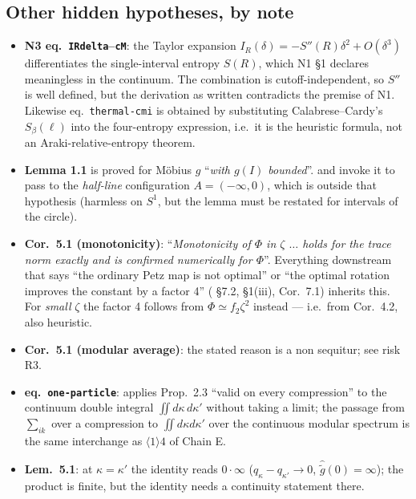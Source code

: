 \documentclass[11pt]{article}
\newcommand{\NI}{N1}\newcommand{\NII}{N2}\newcommand{\NIII}{N3}
\newcommand{\CMI}{I}
\newcommand{\zz}{\zeta}
\newcommand{\gt}{\widetilde g}
\newcommand{\gh}{\widehat{\gt}}
\begin{document}
\subsection{Other hidden hypotheses, by note}
\begin{itemize}[leftmargin=1.4em]
\item \textbf{\NIII{} eq.~\texttt{IRdelta}--\texttt{cM}}: the Taylor expansion $\CMI_R(\delta)=-S''(R)\delta^2+O(\delta^3)$
differentiates the single-interval entropy $S(R)$, which \NI{} \S1 declares meaningless in the continuum.
The combination is cutoff-independent, so $S''$ is well defined, but the derivation as written contradicts the
premise of \NI.  Likewise eq.~\texttt{thermal-cmi} is obtained by substituting Calabrese--Cardy's $S_\beta(\ell)$ into
the four-entropy expression, i.e.\ it is the heuristic formula, not an Araki-relative-entropy theorem.
\item \textbf{\NV{} Lemma 1.1} is proved for M\"obius $g$ ``\emph{with $g(I)$ bounded}''.  \NVI{} and \NVII{} invoke it
to pass to the \emph{half-line} configuration $A=(-\infty,0)$, which is outside that hypothesis (harmless on $S^1$, but
the lemma must be restated for intervals of the circle).
\item \textbf{\NV{} Cor.~5.1 (monotonicity)}: ``\emph{Monotonicity of $\Phi$ in $\zz$ $\dots$ holds for the trace norm
exactly and is confirmed numerically for $\Phi$}''.  Everything downstream that says ``the ordinary Petz map is not
optimal'' or ``the optimal rotation improves the constant by a factor 4'' (\NV{} \S7.2, \NVI{} \S1(iii), \NVII{}
Cor.~7.1) inherits this.  For \emph{small} $\zz$ the factor 4 follows from $\Phi\simeq f_2\zz^2$ instead --- i.e.\ from
Cor.~4.2, also heuristic.
\item \textbf{\NV{} Cor.~5.1 (modular average)}: the stated reason is a non sequitur; see risk R3.
\item \textbf{\NVII{} eq.~\texttt{one-particle}}: applies \NV{} Prop.~2.3 ``valid on every compression'' to the
continuum double integral $\iint d\kappa\,d\kappa'$ without taking a limit; the passage from
$\sum_{ik}$ over a compression to $\iint d\kappa d\kappa'$ over the continuous modular spectrum is the same
interchange as $\langle1\rangle4$ of Chain E.
\item \textbf{\NVII{} Lem.~5.1}: at $\kappa=\kappa'$ the identity reads $0\cdot\infty$ ($q_\kappa-q_{\kappa'}\to0$,
$\gh(0)=\infty$); the product is finite, but the identity needs a continuity statement there.
\end{itemize}
\end{document}

